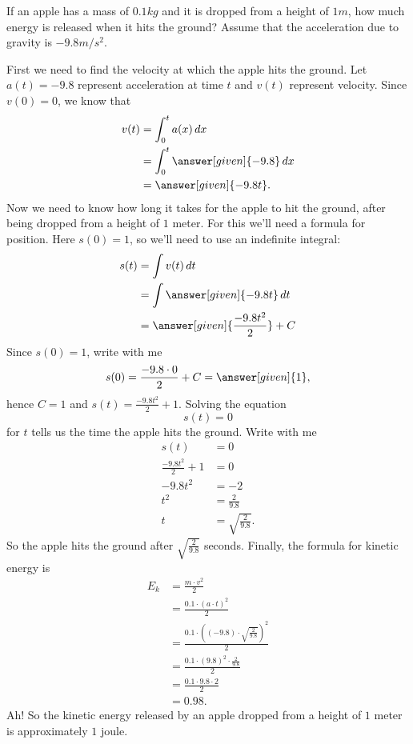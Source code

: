 \documentclass{ximera}
\begin{document}
\begin{example}
  If an apple has a mass of $0.1\unit{kg}$ and it is dropped from a
  height of $1\unit{m}$, how much energy is released when it hits the
  ground? Assume that the acceleration due to gravity is
  $-9.8\unit{m}/\unit{s}^2$.
  \begin{explanation}
    First we need to find the velocity at which the apple hits the
    ground. Let $a(t)=-9.8$ represent acceleration at time $t$ and $v(t)$
    represent velocity. Since $v(0) = 0$, we know that
    \begin{align*}
      v(t) &= \int_0^t a(x) \d x\\
      &= \int_0^t \answer[given]{-9.8} \d x \\
      &= \answer[given]{-9.8t}.
    \end{align*}
    Now we need to know how long it takes for the apple to hit the
    ground, after being dropped from a height of $1$ meter. For this
    we'll need a formula for position. Here $s(0) = 1$, so we'll need
    to use an indefinite integral:
    \begin{align*}
      s(t)&=\int v(t) \d t\\
      &= \int \answer[given]{-9.8t} \d t \\
      &= \answer[given]{\frac{-9.8 t^2}{2}} + C
    \end{align*}
    Since $s(0)= 1$, write with me
    \[
    s(0) = \frac{-9.8 \cdot 0}{2} + C = \answer[given]{1},
    \]
    hence $C =1$ and $s(t) = \frac{-9.8 t^2}{2}+1$. Solving the equation
    \[
    s(t) = 0
    \]
    for $t$ tells us the time the apple hits the ground. Write with me
    \begin{align*}
      s(t) &= 0 \\
      \frac{-9.8 t^2}{2} +1 &= 0\\
      -9.8 t^2 &=-2\\
      t^2 &=\frac{2}{9.8}\\
      t &=\sqrt{\frac{2}{9.8}}.
    \end{align*}
    So the apple hits the ground after $\sqrt{\frac{2}{9.8}}$ seconds.
    Finally, the formula for kinetic energy is
    \begin{align*}
    E_k &= \frac{m \cdot v^2}{2} \\
    &= \frac{0.1 \cdot \left(a\cdot t\right)^2}{2} \\
    &= \frac{0.1 \cdot \left((-9.8)\cdot \sqrt{\frac{2}{9.8}}\right)^2}{2} \\
    &= \frac{0.1 \cdot (9.8)^2\cdot\frac{2}{9.8}}{2} \\
    &= \frac{0.1 \cdot 9.8\cdot 2}{2} \\
    &= 0.98.
    \end{align*}
    Ah! So the kinetic energy released by an apple dropped from a
    height of $1$ meter is approximately $1$ joule.
  \end{explanation}
\end{example}
\end{document}
